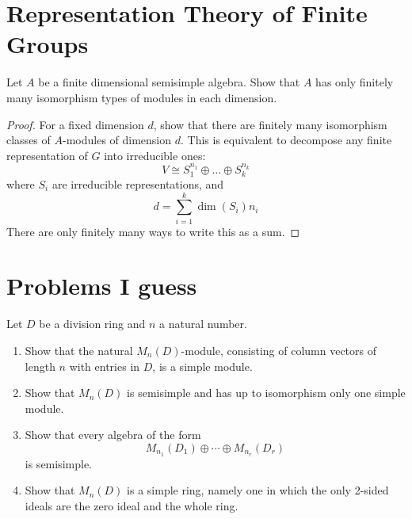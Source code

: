 \documentclass[openany]{book}
\begin{document}
\chapter{Representation Theory of Finite Groups}
\begin{prob}
Let \( A \) be a finite dimensional semisimple algebra. Show that \( A \) has only finitely many isomorphism types of modules in each dimension. 



\end{prob}
\begin{proof}
    For a fixed dimension $d$, show that there are finitely many isomorphism classes of $A$-modules of dimension $d$. This is equivalent to decompose any finite representation of $G$ into irreducible ones:
    \begin{equation*}
        V\cong S_1^{n_1}\oplus\dots\oplus S_k^{n_k}
    \end{equation*}
    where $S_i$ are irreducible representations, and 
    \begin{equation*}
        d=\sum_{i=1}^k \dim(S_i)n_i
    \end{equation*}
    There are only finitely many ways to write this as a sum.
\end{proof}







\chapter{Problems I guess}


\begin{prob}
Let \( D \) be a division ring and \( n \) a natural number.

\begin{enumerate}[label=(\alph*)]
    \item Show that the natural \( M_n(D) \)-module, consisting of column vectors of length \( n \) with entries in \( D \), is a simple module.
    \item Show that \( M_n(D) \) is semisimple and has up to isomorphism only one simple module.
    \item Show that every algebra of the form
    \[
    M_{n_1}(D_1) \oplus \cdots \oplus M_{n_r}(D_r)
    \]
    is semisimple.
    \item Show that \( M_n(D) \) is a simple ring, namely one in which the only 2-sided ideals are the zero ideal and the whole ring.
\end{enumerate}
\end{prob}
\end{document}
